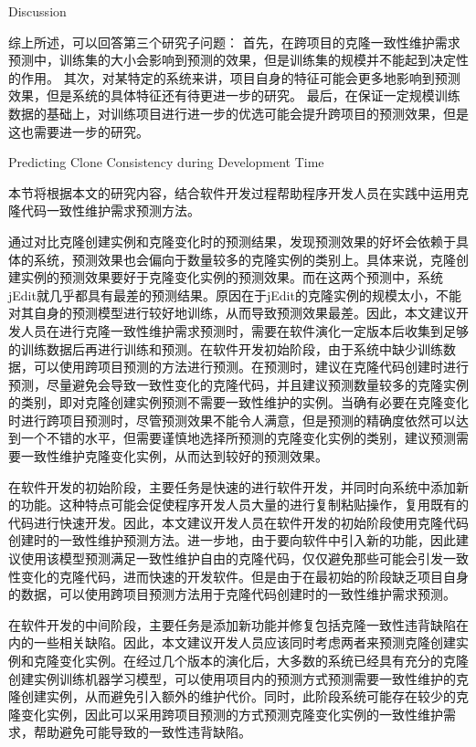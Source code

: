 

{Discussion}

综上所述，可以回答第三个研究子问题：
首先，在跨项目的克隆一致性维护需求预测中，训练集的大小会影响到预测的效果，但是训练集的规模并不能起到决定性的作用。
其次，对某特定的系统来讲，项目自身的特征可能会更多地影响到预测效果，但是系统的具体特征还有待更进一步的研究。
最后，在保证一定规模训练数据的基础上，对训练项目进行进一步的优选可能会提升跨项目的预测效果，但是这也需要进一步的研究。

{Predicting Clone Consistency during Development Time}

本节将根据本文的研究内容，结合软件开发过程帮助程序开发人员在实践中运用克隆代码一致性维护需求预测方法。

通过对比克隆创建实例和克隆变化时的预测结果，发现预测效果的好坏会依赖于具体的系统，预测效果也会偏向于数量较多的克隆实例的类别上。具体来说，克隆创建实例的预测效果要好于克隆变化实例的预测效果。而在这两个预测中，系统jEdit就几乎都具有最差的预测结果。原因在于jEdit的克隆实例的规模太小，不能对其自身的预测模型进行较好地训练，从而导致预测效果最差。因此，本文建议开发人员在进行克隆一致性维护需求预测时，需要在软件演化一定版本后收集到足够的训练数据后再进行训练和预测。在软件开发初始阶段，由于系统中缺少训练数据，可以使用跨项目预测的方法进行预测。在预测时，建议在克隆代码创建时进行预测，尽量避免会导致一致性变化的克隆代码，并且建议预测数量较多的克隆实例的类别，即对克隆创建实例预测不需要一致性维护的实例。当确有必要在克隆变化时进行跨项目预测时，尽管预测效果不能令人满意，但是预测的精确度依然可以达到一个不错的水平，但需要谨慎地选择所预测的克隆变化实例的类别，建议预测需要一致性维护克隆变化实例，从而达到较好的预测效果。

在软件开发的初始阶段，主要任务是快速的进行软件开发，并同时向系统中添加新的功能。这种特点可能会促使程序开发人员大量的进行复制粘贴操作，复用既有的代码进行快速开发。因此，本文建议开发人员在软件开发的初始阶段使用克隆代码创建时的一致性维护预测方法。进一步地，由于要向软件中引入新的功能，因此建议使用该模型预测满足一致性维护自由的克隆代码，仅仅避免那些可能会引发一致性变化的克隆代码，进而快速的开发软件。但是由于在最初始的阶段缺乏项目自身的数据，可以使用跨项目预测方法用于克隆代码创建时的一致性维护需求预测。

在软件开发的中间阶段，主要任务是添加新功能并修复包括克隆一致性违背缺陷在内的一些相关缺陷。因此，本文建议开发人员应该同时考虑两者来预测克隆创建实例和克隆变化实例。在经过几个版本的演化后，大多数的系统已经具有充分的克隆创建实例训练机器学习模型，可以使用项目内的预测方式预测需要一致性维护的克隆创建实例，从而避免引入额外的维护代价。同时，此阶段系统可能存在较少的克隆变化实例，因此可以采用跨项目预测的方式预测克隆变化实例的一致性维护需求，帮助避免可能导致的一致性违背缺陷。

